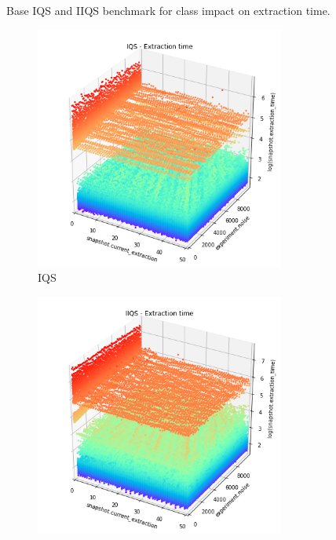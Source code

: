 \begin{figure}
    \caption{Base IQS and IIQS benchmark for class impact on extraction time.}
    \label{FIG:BENCHMARK_05_CLASSES}
\end{figure}

\begin{figure}
    \centering
    \begin{subfigure}[b]{0.45\textwidth}
        \centering
        \includegraphics[width=0.9\textwidth]{./fragments/04_experimental_execution/images/01_basebenchmark_08_extraction_bias.png.1_0.png}
        \caption{IQS}
        \label{FIG:BENCHMARK_05_CLASSES__0_0}
    \end{subfigure}
    \hfill
    \begin{subfigure}[b]{0.45\textwidth}
        \centering
        \includegraphics[width=0.9\textwidth]{./fragments/04_experimental_execution/images/01_basebenchmark_08_extraction_bias.png.0_0.png}

\end{subfigure}
\end{figure}
